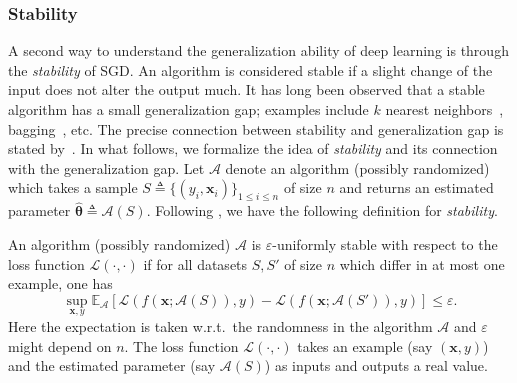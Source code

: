 

\subsubsection{Stability} A second way to understand the generalization ability of deep learning is through the \emph{stability} of SGD. An algorithm is considered
stable if a slight change of the input does not alter the output much. It has long been observed that a stable algorithm has a small generalization gap; examples include $k$ nearest neighbors~\citep{rogers1978finite, devroye1979distribution}, bagging~\citep{breiman1996bagging, breiman1996heuristics}, etc. The precise connection between stability and generalization gap is stated by~\cite{bousquet2002stability, shalev2010learnability}. In what follows, we formalize the idea of \emph{stability} and its connection with the generalization
gap. Let $\mathcal{A}$ denote an algorithm (possibly randomized) which takes a sample $S\triangleq\{(y_{i},\bm{x}_{i})\}_{1 \leq i \leq n}$
of size $n$ and returns an estimated parameter $\hat{\bm{\theta}}\triangleq\mathcal{A}(S)$.
Following \cite{hardt2015train}, we have the following definition
for \emph{stability}.

\begin{definition}An algorithm (possibly randomized) $\mathcal{A}$
is $\varepsilon$-uniformly stable with respect to the loss function
$\mathcal{L}(\cdot,\cdot)$ if for all datasets $S,S'$ of size $n$ which differ
in at most one example, one has 
\[
\sup_{\bm{x},y}\mathbb{E}_{\mathcal{A}}\left[\mathcal{L}\left(f(\bm{x};\mathcal{A}\left(S\right)),y\right)-\mathcal{L}\left(f(\bm{x}; \mathcal{A}\left(S'\right)),y\right)\right]\leq\varepsilon.
\]
Here the expectation is taken w.r.t.~the randomness in the algorithm
$\mathcal{A}$ and $\varepsilon$ might depend on $n$. The loss function $\mathcal{L}(\cdot,\cdot)$ takes an example (say $(\bm{x},y)$) and the estimated
parameter (say $\mathcal{A}(S)$) as inputs and outputs a real value. \end{definition}

